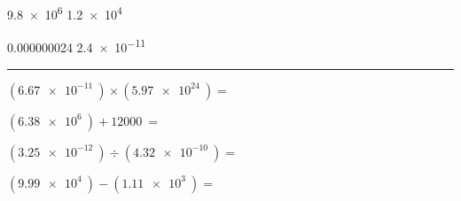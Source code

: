 \documentclass[12pt]{exam}
\begin{document}
\begin{questions}
\begin{multicols}{2}
      \vspace{1em}

    \question
      \begin{oneparcheckboxes}
        \choice \SI{9.8e6}{}
        \choice \SI{1.2e4}{}
      \end{oneparcheckboxes}

      \vspace{1em}

    \question
      \begin{oneparcheckboxes}
        \choice \SI{0.000000024}{}
        \choice \SI{2.4e-11}{}
      \end{oneparcheckboxes}

      \vspace{1em}

  \end{multicols}

  \vs
  \hrule



  \begin{multicols}{2}

    \question
      $
      \left( \SI{6.67e-11}{} \right) \times 
      \left( \SI{5.97e24}{} \right) =
      $
      \vspace{3em}

    \question
      $
      \left( \SI{6.38e6}{} \right) + \SI{12000}{} =
      $
      \vspace{3em}

    \question
      $
      \left( \SI{3.25e-12}{} \right) \div 
      \left( \SI{4.32e-10}{} \right) =
      $
      \vspace{3em}

    \question
      $
      \left( \SI{9.99e4}{} \right) - 
      \left( \SI{1.11e3}{} \right) =
      $
      \vspace{3em}

  \end{multicols}

  \vs



\end{questions}
\end{document}

